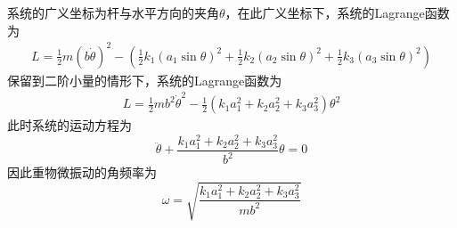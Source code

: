 \begin{solution}
系统的广义坐标为杆与水平方向的夹角$\theta$，在此广义坐标下，系统的Lagrange函数为
\begin{align*}
	L = \frac12 m(b\dot{\theta})^2 - \left(\frac12 k_1 (a_1\sin \theta)^2 + \frac12 k_2 (a_2\sin \theta)^2 + \frac12 k_3 (a_3\sin \theta)^2\right)
\end{align*}
保留到二阶小量的情形下，系统的Lagrange函数为
\begin{align*}
	L = \frac12 mb^2 \dot{\theta}^2 - \frac12 \left(k_1 a_1^2 + k_2 a_2^2 + k_3 a_3^2\right) \theta^2
\end{align*}
此时系统的运动方程为
\begin{equation*}
	\ddot{\theta} + \frac{k_1 a_1^2 + k_2 a_2^2 + k_3 a_3^2}{b^2} \theta = 0
\end{equation*}
因此重物微振动的角频率为
\begin{equation*}
	\omega = \sqrt{\frac{k_1 a_1^2 + k_2 a_2^2 + k_3 a_3^2}{mb^2}}
\end{equation*}
\end{solution}
